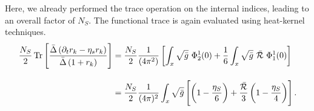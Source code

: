 Here, we already performed the trace operation on the internal indices, leading to an overall factor of $N_S$. The functional trace is again evaluated using heat-kernel techniques.
\begin{equation}
\begin{aligned}
	\frac{N_S}{2}\operatorname{Tr}\left[ \frac{\bar{\Delta}\left(\partial_t r_k - \eta_s r_k\right)}{\bar{\Delta}\left(1 + r_k\right)} \right] &= \frac{N_S}{2}\frac{1}{(4\pi^2)}\left[\int_x\sqrt{\bar{g}} \  \Phi_2^1(0) + \frac{1}{6}\int_x\sqrt{\bar{g}} \ \bar{\mathcal{R}}\ \Phi_1^1(0) \right]\\[10pt]
	&= 	\frac{N_S}{2}\frac{1}{(4\pi)^2}\int_x\sqrt{\bar{g}}\left[\left(1-\frac{\eta_S}{6}\right) + \frac{\bar{\mathcal{R}}}{3}\left(1-\frac{\eta_S}{4}\right)\right].
\end{aligned}
\end{equation}
